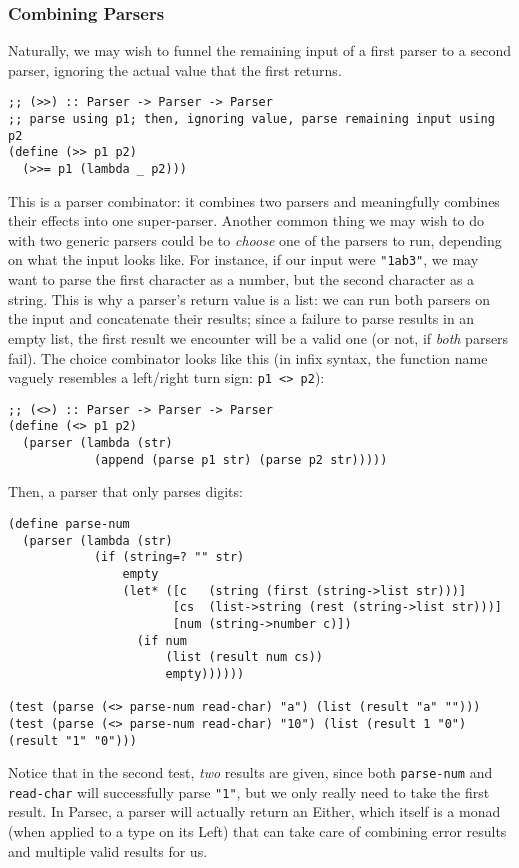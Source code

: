 \subsubsection{Combining Parsers}
Naturally, we may wish to funnel the remaining input of a first parser to a second parser, ignoring the actual value that the first returns.
\begin{verbatim}
;; (>>) :: Parser -> Parser -> Parser
;; parse using p1; then, ignoring value, parse remaining input using p2
(define (>> p1 p2)
  (>>= p1 (lambda _ p2)))
\end{verbatim}
This is a parser combinator: it combines two parsers and meaningfully combines their effects into one super-parser. Another common thing we may wish to do with two generic parsers could be to \textit{choose} one of the parsers to run, depending on what the input looks like. For instance, if our input were \texttt{"1ab3"}, we may want to parse the first character as a number, but the second character as a string. This is why a parser's return value is a list: we can run both parsers on the input and concatenate their results; since a failure to parse results in an empty list, the first result we encounter will be a valid one (or not, if \textit{both} parsers fail). The choice combinator looks like this (in infix syntax, the function name vaguely resembles a left/right turn sign: \texttt{p1 <> p2}):
\begin{verbatim}
;; (<>) :: Parser -> Parser -> Parser
(define (<> p1 p2)
  (parser (lambda (str)
            (append (parse p1 str) (parse p2 str)))))
\end{verbatim}
Then, a parser that only parses digits:
\begin{verbatim}
(define parse-num
  (parser (lambda (str)
            (if (string=? "" str)
                empty
                (let* ([c   (string (first (string->list str)))]
                       [cs  (list->string (rest (string->list str)))]
                       [num (string->number c)])
                  (if num
                      (list (result num cs))
                      empty))))))
                      
(test (parse (<> parse-num read-char) "a") (list (result "a" "")))
(test (parse (<> parse-num read-char) "10") (list (result 1 "0") (result "1" "0")))
\end{verbatim}
Notice that in the second test, \textit{two} results are given, since both \texttt{parse-num} and \texttt{read-char} will successfully parse \texttt{"1"}, but we only really need to take the first result. In Parsec, a parser will actually return an Either, which itself is a monad (when applied to a type on its Left) that can take care of combining error results and multiple valid results for us.

